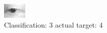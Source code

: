 \begin{figure}[h!]
\begin{center}
\includegraphics[width=0.60\columnwidth]{figures/ID2701_class_3_target_4.png}
\end{center}
\caption{ Classification: 3 actual target: 4}
\label{fig:ID2701_class_3_target_4}
\end{figure}
